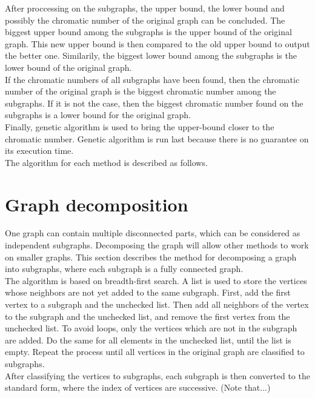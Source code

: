 \documentclass[a4paper]{report}
\begin{document}
	After proccessing on the subgraphs, the upper bound, the lower bound and possibly the chromatic number of the original graph can be concluded. The biggest upper bound among the subgraphs is the upper bound of the original graph. This new upper bound is then compared to the old upper bound to output the better one. Similarily, the biggest lower bound among the subgraphs is the lower bound of the original graph. \\
	If the chromatic numbers of all subgraphs have been found, then the chromatic number of the original graph is the biggest chromatic number among the subgraphs. If it is not the case, then the biggest chromatic number found on the subgraphs is a lower bound for the original graph.\\
	Finally, genetic algorithm is used to bring the upper-bound closer to the chromatic number. Genetic algorithm is run last because there is no guarantee on its execution time.\\
	The algorithm for each method is described as follows.
	

		\section{Graph decomposition}
		One graph can contain multiple disconnected parts, which can be considered as independent subgraphs. Decomposing the graph will allow other methods to work on smaller graphs. This section describes the method for decomposing a graph into subgraphs, where each subgraph is a fully connected graph.\\
		The algorithm is based on breadth-first search. A list is used to store the vertices whose neighbors are not yet added to the same subgraph. First, add the first vertex to a subgraph and the unchecked list. Then add all neighbors of the vertex to the subgraph and the unchecked list, and remove the first vertex from the unchecked list. To avoid loops, only the vertices which are not in the subgraph are added. Do the same for all elements in the unchecked list, until the list is empty. Repeat the process until all vertices in the original graph are classified to subgraphs.\\
		After classifying the vertices to subgraphs, each subgraph is then converted to the standard form, where the index of vertices are successive.
		(Note that...)
		
\end{document}
